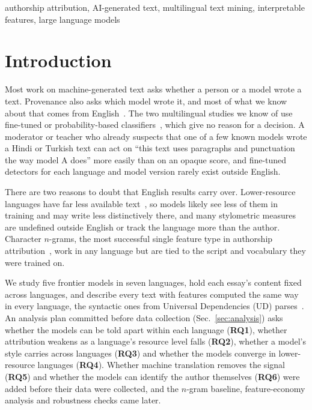 \documentclass[conference,compsoc]{IEEEtran}
\begin{document}
\begin{IEEEkeywords}
authorship attribution, AI-generated text, multilingual text mining, interpretable features, large language models
\end{IEEEkeywords}

\section{Introduction}
Most work on machine-generated text asks whether a person or a model wrote a text. Provenance also asks which model wrote it, and most of what we know about that comes from English~\cite{uchendu2020authorship,sun2025idiosyncrasies}. The two multilingual studies we know of use fine-tuned or probability-based classifiers~\cite{lacava2026multilingual,greco2026multighost}, which give no reason for a decision. A moderator or teacher who already suspects that one of a few known models wrote a Hindi or Turkish text can act on ``this text uses paragraphs and punctuation the way model A does'' more easily than on an opaque score, and fine-tuned detectors for each language and model version rarely exist outside English.

There are two reasons to doubt that English results carry over. Lower-resource languages have far less available text~\cite{joshi2020state}, so models likely see less of them in training and may write less distinctively there, and many stylometric measures are undefined outside English or track the language more than the author. Character $n$-grams, the most successful single feature type in authorship attribution~\cite{sapkota2015ngrams}, work in any language but are tied to the script and vocabulary they were trained on.

We study five frontier models in seven languages, hold each essay's content fixed across languages, and describe every text with \NFeatures{} features computed the same way in every language, the syntactic ones from Universal Dependencies (UD) parses~\cite{nivre2020ud}. An analysis plan committed before data collection (Sec.~\ref{sec:analysis}) asks whether the models can be told apart within each language (\textbf{RQ1}), whether attribution weakens as a language's resource level falls (\textbf{RQ2}), whether a model's style carries across languages (\textbf{RQ3}) and whether the models converge in lower-resource languages (\textbf{RQ4}). Whether machine translation removes the signal (\textbf{RQ5}) and whether the models can identify the author themselves (\textbf{RQ6}) were added before their data were collected, and the $n$-gram baseline, feature-economy analysis and robustness checks came later.
\end{document}
